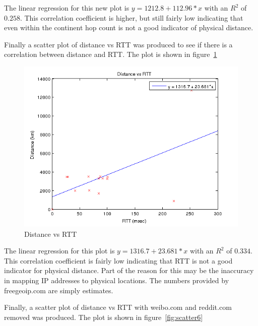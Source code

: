 \documentclass{article}
\begin{document}
The linear regression for this new plot is $y = 1212.8 + 112.96*x$ with an $R^2$ of $0.258$. This correlation coefficient is higher, but still fairly low indicating that even within the continent hop count is not a good indicator of physical distance.

Finally a scatter plot of distance vs RTT was produced to see if there is a correlation between distance and RTT. The plot is shown in figure~\ref{fig:scatter5}

\FloatBarrier
\begin{figure}[h!]
  \includegraphics{distance_vs_rtt1_legend.png}
  \caption{Distance vs RTT}
  \label{fig:scatter5}
\end{figure}
\FloatBarrier

The linear regression for this plot is $y = 1316.7 + 23.681*x$ with an $R^2$ of $0.334$. This correlation coefficient is fairly low indicating that RTT is not a good indicator for physical distance. Part of the reason for this may be the inaccuracy in mapping IP addresses to physical locations. The numbers provided by freegeoip.com are simply estimates.

Finally, a scatter plot of distance vs RTT with weibo.com and reddit.com removed was produced. The plot is shown in figure~\ref{fig:scatter6}
\end{document}
